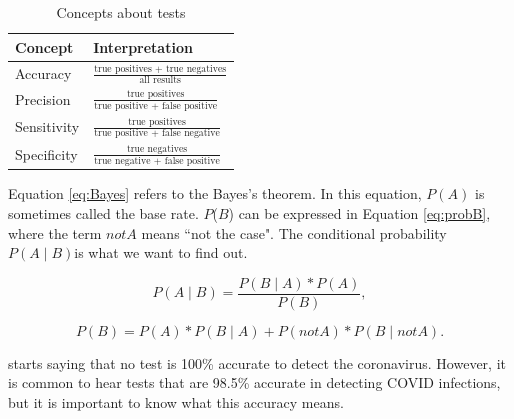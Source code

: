 \documentclass[10pt,leter,openany]{article}
\begin{document}
\begin{table}[]
	\centering
	\caption{Concepts about tests}
	\label{tab:concepts}
	\begin{tabular}{@{}ll@{}}
		\toprule
		\textbf{Concept}     & \textbf{Interpretation}                                                         \\ \midrule
		Accuracy    & $ \frac{\mbox{true positives + true negatives}}{\mbox{all results}}$  \vspace{0.5cm} \\
		Precision   & $ \frac{\mbox{true positives}}{\mbox{true positive + false positive}}$ \vspace{0.5cm} \\
		Sensitivity & $ \frac{\mbox{true positives}}{\mbox{true positive + false negative}}$ \vspace{0.5cm} \\
		Specificity & $ \frac{\mbox{true negatives}}{\mbox{true negative + false positive}}$ \vspace{0.5cm} \\ \bottomrule
	\end{tabular}
\end{table}


Equation \ref{eq:Bayes} refers to the Bayes's theorem. In this equation, $P(A) $ is sometimes called the base rate. $P$($B$) can be expressed in Equation \ref{eq:probB}, where the term $not A$ means ``not the case". The conditional probability $P(A \mid B ) $is what we want to find out.

\begin{equation} \label{eq:Bayes}
	P(A \mid B)  = \dfrac{P(B\mid A) * P(A)}{P(B)},
\end{equation}

\begin{equation} \label{eq:probB}
	P(B) = P(A)*P(B\mid A) + P(not A)*P(B\mid not A).
\end{equation}

	\citet{archit2020} starts saying that no test is 100\% accurate to detect the coronavirus. However, it is common to hear tests that are 98.5\% accurate in detecting COVID infections, but it is important to know what this accuracy means.
	
\end{document}
